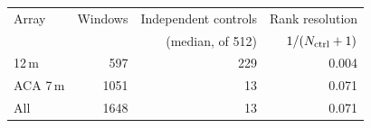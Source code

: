 \begin{tabular}{@{}lrrr@{}}
\toprule
Array & Windows & Independent controls & Rank resolution \\
 & & (median, of 512) & $1/(N_{\rm ctrl}+1)$ \\
\midrule
12\,m & 597 & 229 & 0.004 \\
ACA 7\,m & 1051 & 13 & 0.071 \\
\midrule
All & 1648 & 13 & 0.071 \\
\bottomrule
\end{tabular}
